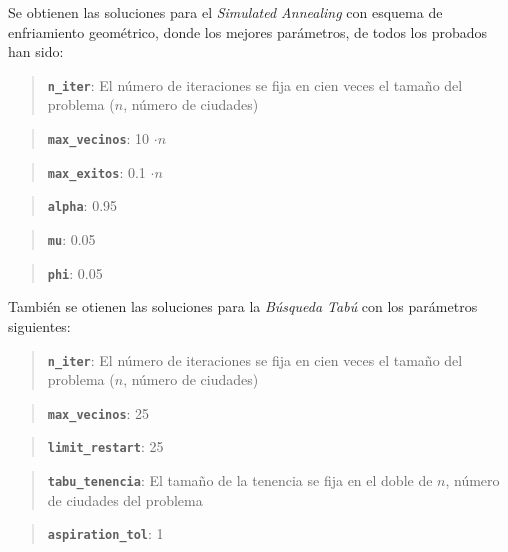 \documentclass{article}
\begin{document}
    Se obtienen las soluciones para el \emph{Simulated Annealing} con
esquema de enfriamiento geométrico, donde los mejores parámetros, de
todos los probados han sido:

\begin{quote}
\textbf{\texttt{n\_iter}}: El número de iteraciones se fija en cien
veces el tamaño del problema ($n$, número de ciudades)
\end{quote}

\begin{quote}
\textbf{\texttt{max\_vecinos}}: 10 $\cdot n$
\end{quote}

\begin{quote}
\textbf{\texttt{max\_exitos}}: 0.1 $\cdot n$
\end{quote}

\begin{quote}
\textbf{\texttt{alpha}}: 0.95
\end{quote}

\begin{quote}
\textbf{\texttt{mu}}: 0.05
\end{quote}

\begin{quote}
\textbf{\texttt{phi}}: 0.05
\end{quote}

También se otienen las soluciones para la \emph{Búsqueda Tabú} con los
parámetros siguientes:

\begin{quote}
\textbf{\texttt{n\_iter}}: El número de iteraciones se fija en cien
veces el tamaño del problema ($n$, número de ciudades)
\end{quote}

\begin{quote}
\textbf{\texttt{max\_vecinos}}: 25
\end{quote}

\begin{quote}
\textbf{\texttt{limit\_restart}}: 25
\end{quote}

\begin{quote}
\textbf{\texttt{tabu\_tenencia}}: El tamaño de la tenencia se fija en el
doble de $n$, número de ciudades del problema
\end{quote}

\begin{quote}
\textbf{\texttt{aspiration\_tol}}: 1
\end{quote}
\end{document}

